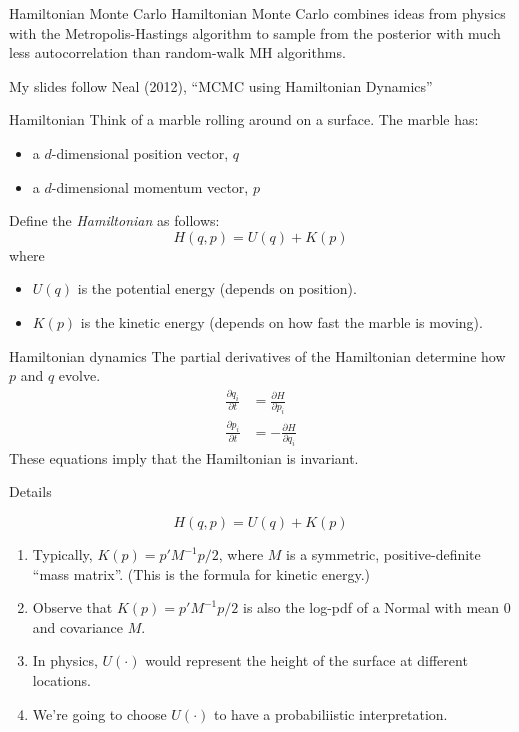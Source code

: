 \documentclass[aspectratio=169]{beamer}
\begin{document}
%
\begin{frame}{Hamiltonian Monte Carlo}
Hamiltonian Monte Carlo combines ideas from physics with the Metropolis-Hastings algorithm to sample from the posterior with much less autocorrelation than random-walk MH algorithms.

My slides follow Neal (2012), ``MCMC using Hamiltonian Dynamics''
\end{frame}

\begin{frame}{Hamiltonian}
Think of a marble rolling around on a surface.  The marble has:
\begin{itemize}
	\item a $d$-dimensional position vector, $q$
	\item a $d$-dimensional momentum vector, $p$
\end{itemize}
Define the {\it Hamiltonian} as follows:
$$  H(q,p) = U(q) + K(p)  $$
where
\begin{itemize}
	\item $U(q)$ is the potential energy (depends on position).
	\item $K(p)$ is the kinetic energy (depends on how fast the marble is moving).
\end{itemize}
\end{frame}

\begin{frame}{Hamiltonian dynamics}
The partial derivatives of the Hamiltonian determine how $p$ and $q$ evolve.
\begin{align*}
\frac{\partial q_i}{\partial t} &= \frac{\partial H}{\partial p_i} \\
\frac{\partial p_i}{\partial t} &= -\frac{\partial H}{\partial q_i} 
\end{align*}
These equations imply that the Hamiltonian is invariant.
\end{frame}

\begin{frame}{Details}

$$H(q,p) = U(q) + K(p)$$

\begin{enumerate}
	\item Typically, $K(p) = p'M^{-1}p/2$, where $M$ is a symmetric, positive-definite ``mass matrix''.  (This is the formula for kinetic energy.)
	\item Observe that $K(p)=p'M^{-1}p/2$ is also the log-pdf of a Normal with mean 0 and covariance $M$.
	\item In physics, $U(\cdot)$ would represent the height of the surface at different locations.
	\item We're going to choose $U(\cdot)$ to have a probabiliistic interpretation.
\end{enumerate}
\end{frame}
\end{document}
